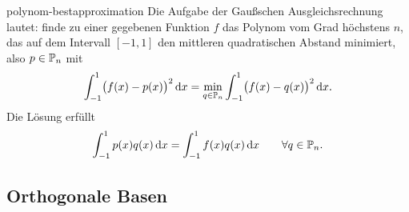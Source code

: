 \begin{Beispiel}{polynom-bestapproximation}
  Die Aufgabe der Gaußschen Ausgleichsrechnung lautet: finde zu einer
  gegebenen Funktion $f$ das Polynom vom Grad höchstens $n$, das auf
  dem Intervall $[-1,1]$ den mittleren quadratischen Abstand
  minimiert, also $p\in \P_n$ mit
  \begin{gather}
    \int_{-1}^1 \bigl(f(x)-p(x)\bigr)^2 \dx
    = \min_{q\in \P_n} \int_{-1}^1 \bigl(f(x)-q(x)\bigr)^2 \dx.
  \end{gather}
  Die Lösung erfüllt
  \begin{gather}
    \int_{-1}^1 p(x)q(x) \dx = \int_{-1}^1 f(x)q(x) \dx
    \qquad\forall q\in \P_n.
  \end{gather}
\end{Beispiel}


\subsection{Orthogonale Basen}



